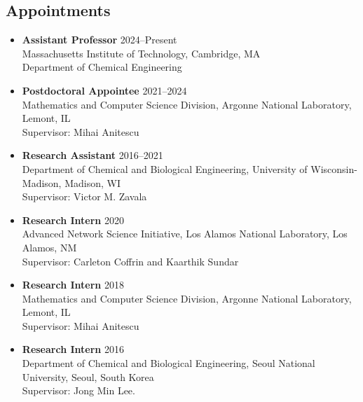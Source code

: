 \subsection*{Appointments}
\begin{itemize}[itemsep=1pt, parsep=0pt,leftmargin=*]
\item[] {\bf Assistant Professor} \hfill 2024--Present\\
Massachusetts Institute of Technology, Cambridge, MA\\
Department of Chemical Engineering
\item[] {\bf Postdoctoral Appointee} \hfill 2021--2024\\
  Mathematics and Computer Science Division,
  Argonne National Laboratory, Lemont, IL\\
  Supervisor: Mihai Anitescu
\item[] {\bf Research Assistant} \hfill 2016--2021\\
  Department of Chemical and Biological Engineering,
  University of Wisconsin-Madison, Madison, WI\\
  Supervisor: Victor M. Zavala
\item[] {\bf Research Intern} \hfill 2020\\
  Advanced Network Science Initiative,
  Los Alamos National Laboratory, Los Alamos, NM \\
  Supervisor: Carleton Coffrin and Kaarthik Sundar
\item[] {\bf Research Intern} \hfill 2018\\
  Mathematics and Computer Science Division,
  Argonne National Laboratory, Lemont, IL \\
  Supervisor: Mihai Anitescu
\item[] {\bf Research Intern} \hfill 2016\\
  Department of Chemical and Biological Engineering,
  Seoul National University, Seoul, South Korea \\
  Supervisor: Jong Min Lee.
\end{itemize}
